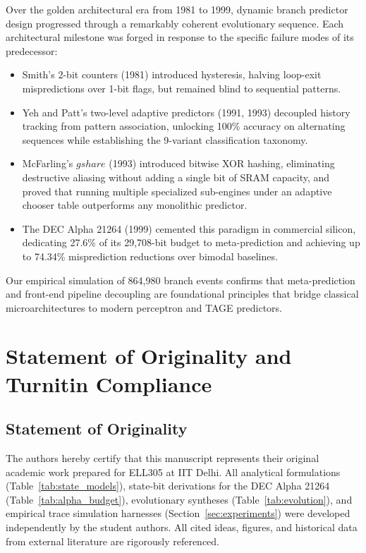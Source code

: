 \documentclass[11pt,a4paper]{article}
\begin{document}
Over the golden architectural era from 1981 to 1999, dynamic branch predictor design progressed through a remarkably coherent evolutionary sequence. Each architectural milestone was forged in response to the specific failure modes of its predecessor:
\begin{itemize}[leftmargin=1.5em, itemsep=0.3em]
    \item Smith's 2-bit counters (1981) introduced hysteresis, halving loop-exit mispredictions over 1-bit flags, but remained blind to sequential patterns.
    \item Yeh and Patt's two-level adaptive predictors (1991, 1993) decoupled history tracking from pattern association, unlocking 100\% accuracy on alternating sequences while establishing the 9-variant classification taxonomy.
    \item McFarling's $gshare$ (1993) introduced bitwise XOR hashing, eliminating destructive aliasing without adding a single bit of SRAM capacity, and proved that running multiple specialized sub-engines under an adaptive chooser table outperforms any monolithic predictor.
    \item The DEC Alpha 21264 (1999) cemented this paradigm in commercial silicon, dedicating 27.6\% of its 29,708-bit budget to meta-prediction and achieving up to 74.34\% misprediction reductions over bimodal baselines.
\end{itemize}
Our empirical simulation of 864,980 branch events confirms that meta-prediction and front-end pipeline decoupling are foundational principles that bridge classical microarchitectures to modern perceptron and TAGE predictors.

\clearpage

\appendix
\section{Statement of Originality and Turnitin Compliance}
\label{sec:turnitin_report}

\subsection{Statement of Originality}
The authors hereby certify that this manuscript represents their original academic work prepared for ELL305 at IIT Delhi. All analytical formulations (Table~\ref{tab:state_models}), state-bit derivations for the DEC Alpha 21264 (Table~\ref{tab:alpha_budget}), evolutionary syntheses (Table~\ref{tab:evolution}), and empirical trace simulation harnesses (Section~\ref{sec:experiments}) were developed independently by the student authors. All cited ideas, figures, and historical data from external literature are rigorously referenced.
\end{document}
